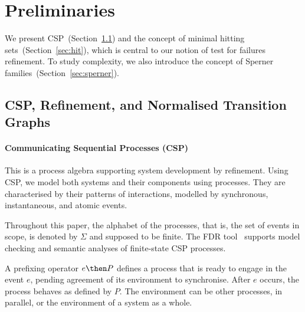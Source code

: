 \section{Preliminaries}
\label{section:preliminaries}

We present CSP~(Section~\ref{section:csp}) and the concept of minimal hitting
sets~(Section~\ref{sec:hit}), which is central to our notion of test
for failures refinement. To study complexity, we also introduce the concept
of Sperner families~(Section~\ref{sec:sperner}).

\subsection{CSP, Refinement, and Normalised Transition Graphs}
\label{section:csp}

\paragraph{Communicating Sequential Processes (CSP)} This is a process algebra supporting
system development by refinement. Using CSP, we model both systems and their
components using processes. They are characterised by their patterns of
interactions, modelled by synchronous, instantaneous, and atomic events.

Throughout this paper, the alphabet of the processes, that is, the set of
events in scope, is denoted by $\Sigma$ and supposed to be finite.
The FDR tool~\cite{fdr} supports model checking and semantic analyses of
finite-state CSP processes.

A prefixing operator $e \then P$ defines a process that is ready to engage in
the event $e$, pending agreement of its environment to synchronise. After $e$
occurs, the process behaves as defined by $P$. The environment can be other
processes, in parallel, or the environment of a system as a whole.

